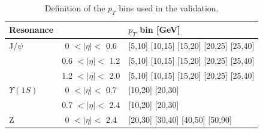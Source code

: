 \begin{table}[hbH]
\begin{center}
\caption{Definition of the $p_T$ bins used in the validation.\label{tab:pt_bins}}
\begin{tabular}{|l|cl|}
\hline
Resonance & & $p_T$ bin [GeV] \\
\hline
J/$\psi$      & 0   $<|\eta|<$ 0.6 & [5,10] [10,15] [15,20] [20,25] [25,40] \\
              & 0.6 $<|\eta|<$ 1.2 & [5,10] [10,15] [15,20] [20,25] [25,40] \\
              & 1.2 $<|\eta|<$ 2.0 & [5,10] [10,15] [15,20] [20,25] [25,40] \\
\hline                     
$\Upsilon(1S)$& 0   $<|\eta|<$ 0.7 & [10,20] [20,30] \\
              & 0.7 $<|\eta|<$ 2.4 & [10,20] [20,30] \\
\hline                     
Z             & 0   $<|\eta|<$ 2.4 & [20,30] [30,40] [40,50] [50,90] \\
\hline
\end{tabular}
\end{center}
\end{table}


